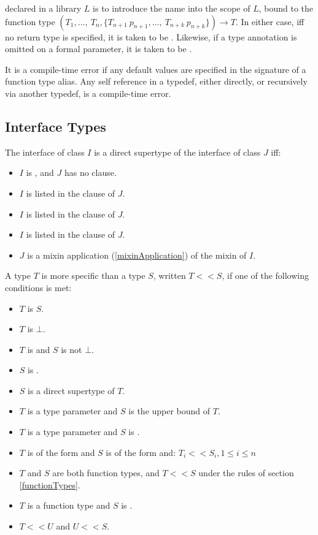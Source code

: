 \documentclass[makeidx]{article}
\begin{document}
{

\noindent
declared in a library $L$ is to introduce the name \id{} into the scope of $L$, bound to the function type
$(T_1, \ldots,\ T_n, \{T_{n+1}\ p_{n+1}, \ldots,\ T_{n+k}\ p_{n+k}\}) \rightarrow T$.
In either case, if{}f no return type is specified, it is taken to be \DYNAMIC{}.
Likewise, if a type annotation is omitted on a formal parameter, it is taken to be \DYNAMIC{}.

\LMHash{}%
It is a compile-time error if any default values are specified in the signature of a function type alias.
Any self reference in a typedef, either directly, or recursively via another typedef, is a compile-time error.


\subsection{Interface Types}

\LMHash{}%
The interface of class $I$ is a direct supertype of the interface of class $J$ if{}f:
\begin{itemize}
\item $I$ is , and $J$ has no \EXTENDS{} clause.
\item $I$ is listed in the \EXTENDS{} clause of $J$.
\item $I$ is listed in the \IMPLEMENTS{} clause of $J$.
\item $I$ is listed in the \WITH{} clause of $J$.
\item $J$ is a mixin application (\ref{mixinApplication}) of the mixin of $I$.
\end{itemize}

\LMHash{}%
A type $T$ is more specific than a type $S$, written $T << S$, if one of the following conditions is met:
\begin{itemize}
\item $T$ is $S$.
\item $T$ is $\bot$.
\item $T$ is  and $S$ is not $\bot$.
\item $S$ is \DYNAMIC{}.
\item $S$ is a direct supertype of $T$.
\item $T$ is a type parameter and $S$ is the upper bound of $T$.
\item $T$ is a type parameter and $S$ is .
\item $T$ is of the form  and $S$ is of the form  and:
$T_i << S_i, 1 \le i \le n$
\item $T$ and $S$ are both function types, and $T << S$ under the rules of section \ref{functionTypes}.
\item $T$ is a function type and $S$ is \FUNCTION{}.
\item $T << U$ and $U << S$.
\end{itemize}

}
\end{document}
